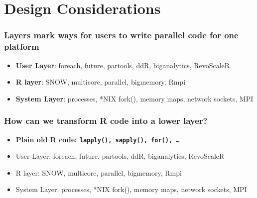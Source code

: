\documentclass{beamer}
\begin{document}
\section{Design Considerations}
\begin{frame}

    \frametitle{Layers mark ways for users to write parallel code for one
    platform}

\begin{itemize}
    \item \textbf{User Layer}: foreach, future, partools, ddR, biganalytics, RevoScaleR
    \item \textbf{R layer}: SNOW, multicore, parallel, bigmemory, Rmpi
    \item \textbf{System Layer}: processes, *NIX fork(), memory maps, network sockets,
    MPI
\end{itemize}

\end{frame}
\begin{frame}

    \frametitle{How can we transform R code into a lower layer?}

\begin{itemize}
    \item \textbf{Plain old R code: \texttt{lapply(), sapply(), for(), \dots}}
\item User Layer: foreach, future, partools, ddR, biganalytics, RevoScaleR
\item R layer: SNOW, multicore, parallel, bigmemory, Rmpi
\item System Layer: processes, *NIX fork(), memory maps, network sockets,
    MPI
\end{itemize}


\end{frame}
\end{document}
